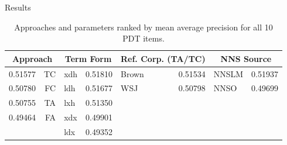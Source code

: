 \documentclass[final,t]{beamer}
\begin{document}
\begin{frame}{}
\begin{columns}[t]
\begin{column}{.64\linewidth}
\begin{columns}
\begin{column}{.49\linewidth}
\begin{block}{Results}
\vspace{.2em}
\begin{table}
\begin{center}
\begin{tabular}{|l|r||l|r||l|r||l|r|}
 \hline
 \multicolumn{2}{|c||}{Approach} & \multicolumn{2}{|c||}{Term Form} & \multicolumn{2}{|c||}{Ref. Corp. (TA/TC)} & \multicolumn{2}{|c|}{NNS Source} \\
 \hline
 \hline
 0.51577 & TC & xdh & 0.51810 & Brown & 0.51534 & NNSLM & 0.51937 \\
 \hline
 0.50780 & FC & ldh & 0.51677 & WSJ & 0.50798 & NNSO & 0.49699 \\
 \hline
 0.50755 & TA & lxh & 0.51350 & & & & \\
 \hline
 0.49464 & FA & xdx & 0.49901 & & & & \\
 \hline
 & 	& ldx & 0.49352 &  &  &  & \\
 \hline
\end{tabular}
\vspace{.7em}
\caption{Approaches and parameters ranked by mean average precision for all 10 PDT items.}
\label{tab:dist-ranked-parameters}
\end{center}
\end{table}


\end{block}
\end{column}
\end{columns}
\end{column}
\end{columns}
\end{frame}
\end{document}
